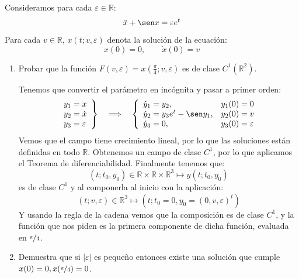 \documentclass[12pt]{article}
\begin{document}
    \newpage
    \begin{ejercicio}
        Consideramos para cada $\varepsilon\in \mathbb{R}$:
        \begin{equation*}
            \ddot{x} + \sen x = \varepsilon e^t
        \end{equation*}
        Para cada $v\in \mathbb{R}$, $x(t;v,\varepsilon)$ denota la solución de la ecuación:
        \begin{equation*}
            x(0) = 0, \qquad \dot{x}(0) = v
        \end{equation*}
        \begin{enumerate}
            \item[i)] Probar que la función $F(v,\varepsilon)=x\left(\frac{\pi}{4};v,\varepsilon\right)$ es de clase $C^1(\mathbb{R}^2)$.

                Tenemos que convertir el parámetro en incógnita y pasar a primer orden:
                \begin{equation*}
                    \left.\begin{array}{l}
                        y_1 = x \\
                        y_2 = \dot{x} \\
                        y_3 = \varepsilon
                    \end{array}\right\} \quad\Longrightarrow\quad \left\{\begin{array}{ll}
                    \dot{y}_1 = y_2 ,& y_1(0) = 0 \\
                    \dot{y}_2 = y_3e^t - \sen y_1 ,& y_2(0) = v \\
                    \dot{y}_3 = 0 ,& y_3(0) = \varepsilon
                    \end{array}\right.
                \end{equation*}
                Vemos que el campo tiene crecimiento lineal, por lo que las soluciones están definidas en todo $\mathbb{R}$. Obtenemos un campo de clase $C^1$, por lo que aplicamos el Teorema de diferenciabilidad. Finalmente tenemos que:
                \begin{equation*}
                    (t;t_0,y_0)\in \mathbb{R}\times\mathbb{R}\times\mathbb{R}^3 \longmapsto y(t;t_0,y_0)
                \end{equation*}
                es de clase $C^1$ y al componerla al inicio con la aplicación:
                \begin{equation*}
                    (t;v,\varepsilon)\in \mathbb{R}^3 \longmapsto (t;t_0=0,y_0=(0,v,\varepsilon)^t)
                \end{equation*}
                Y usando la regla de la cadena vemos que la composición es de clase $C^1$, y la función que nos piden es la primera componente de dicha función, evaluada en $\nicefrac{\pi}{4}$.
            \item[ii)] Demuestra que si $|\varepsilon|$ es pequeño entonces existe una solución que cumple $x(0) = 0, x(\nicefrac{\pi}{4}) = 0$.


\end{enumerate}
\end{ejercicio}
\end{document}
